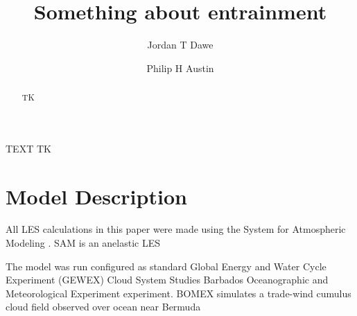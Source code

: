 \documentclass[acp]{copernicus}
\begin{document}
\title{Something about entrainment}


\author[1]{Jordan T Dawe}
\author[1]{Philip H Austin}










\received{}
\pubdiscuss{} %
\revised{}
\accepted{}
\published{}




\maketitle



\begin{abstract}
TK
\end{abstract}





\introduction

TEXT TK


\section{Model Description}

All LES calculations in this paper were made using the System for Atmospheric 
Modeling \citep[SAM;][]{Khairoutdinov2003}.  SAM is an anelastic LES 

The model was run configured as standard Global Energy and Water
Cycle Experiment (GEWEX) Cloud System Studies \citep[GCSS;][]{Randall2003}
Barbados Oceanographic and Meteorological Experiment 
\citep[BOMEX;][]{Siebesma2003} experiment.  BOMEX simulates a trade-wind cumulus 
cloud field observed over ocean near Bermuda
\end{document}
